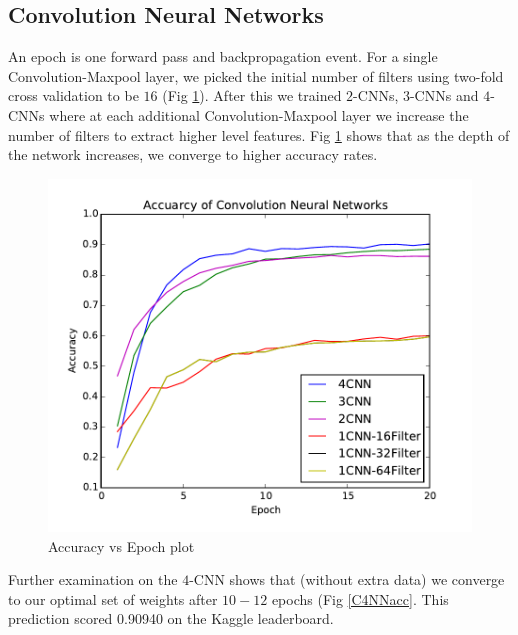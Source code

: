 \documentclass[conference]{IEEEtran}
\begin{document}
\subsection{Convolution Neural Networks}
An epoch is one forward pass and backpropagation event. For a single Convolution-Maxpool layer, we picked the initial number of filters using two-fold cross validation to be $16$ (Fig \ref{CNNacc}). After this we trained $2$-CNNs, $3$-CNNs and $4$-CNNs where at each additional Convolution-Maxpool layer we increase the number of filters to extract higher level features. Fig \ref{CNNacc} shows that as the depth of the network increases, we converge to higher accuracy rates.

\begin{figure}[h]
	\centering
	\includegraphics[scale=0.6]{CNNacc.pdf}
	\caption{Accuracy vs Epoch plot}
	\label{CNNacc}
\end{figure}

Further examination on the $4$-CNN shows that (without extra data) we converge to our optimal set of weights after $10-12$ epochs (Fig \ref{C4NNacc}. This prediction scored 0.90940 on the Kaggle leaderboard.
\end{document}
